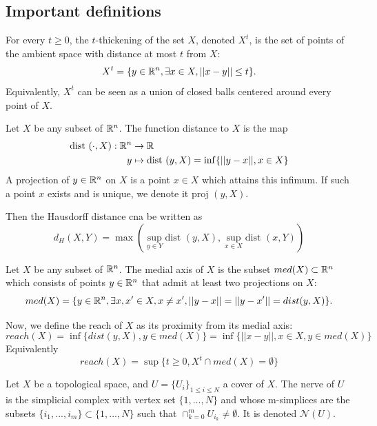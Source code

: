 \subsection{Important definitions}

\begin{definition}
    For every $t \ge 0$, the $t$-thickening of the set $X$, denoted $X^t$, is
    the set of points of the ambient space with distance at most $t$ from $X$:
    $$X^t = \{y \in \mathbb{R}^n, \exists x \in X, ||x - y|| \le t\}.$$
    Equivalently, $X^t$ can be seen as a union of closed balls centered around
    every point of $X$.
\end{definition}

\begin{definition}
    Let $X$ be any subset of $\mathbb{R}^n$. The function distance to $X$ is the map 
    \begin{align*}
        \text{dist }(\cdot, X) : \mathbb{R}^n &\rightarrow \mathbb{R} \\
        y &\mapsto \text{dist }(y, X) = \inf\{||y - x||, x \in X\}
    \end{align*}
    A projection of $y \in \mathbb{R}^n$ on $X$ is a point $x \in X$ which attains
    this infimum. If such a point $x$ exists and is unique, we denote it
    $\text{proj }(y, X)$. 

    Then the Hausdorff distance cna be written as 
    $$
    d_H(X, Y) = \max(\sup_{y\in Y} \text{dist }(y, X), \sup_{x\in X} \text{dist }(x, Y))$$
\end{definition}

\begin{definition}
    Let $X$ be any subset of $\mathbb{R}^n$. The medial axis of $X$ is the subset
    $med(X) \subset \mathbb{R}^n$ which consists of points $y \in \mathbb{R}^n$ that admit at
    least two projections on $X$:
    $$
    med(X) = \{y \in \mathbb{R}^n, \exists x, x' \in X, x \neq x', ||y - x|| = ||y - x'|| = dist(y, X)\}
    .$$
\end{definition}

\begin{definition}
    Now, we define the reach of $X$ as its proximity from its medial axis:
    $$
    reach(X) = \inf\{dist(y, X), y \in med (X)\} = \inf\{||x - y||, x \in X, y \in med (X)\}
    $$
    Equivalently
    $$
    reach(X) = \sup\{t \ge 0, X^t \cap med (X) = \emptyset\}
    $$
\end{definition}

\begin{definition}
    Let $X$ be a topological space, and $U = \{U_i\}_{1\le i\le N}$ a cover of
    $X$. The nerve of $U$ is the simplicial complex with vertex set $\{1, ...,
    N\}$ and whose m-simplices are the subsets $\{i_1, ..., i_m\} \subset \{1,
    ..., N\}$ such that $\cap_{k=0}^m U_{i_k} \neq \emptyset$. It is denoted $\mathcal{N}(U)$.
\end{definition}

